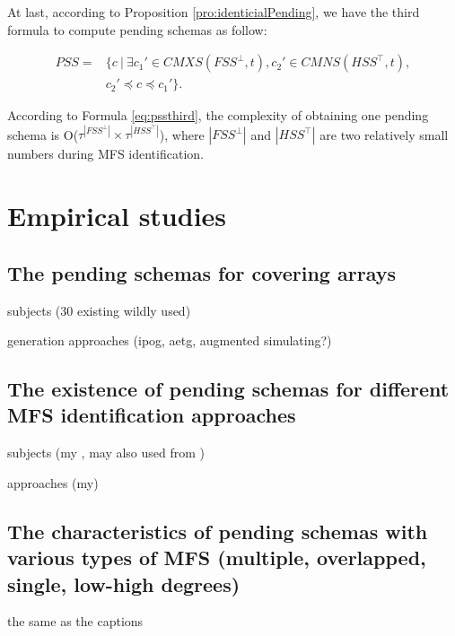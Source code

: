 {At last, according to Proposition \ref{pro:identicialPending}, we have the third formula to compute pending schemas as follow:

\begin{equation}\label{eq:pssthird}
\begin{aligned}
PSS = & \{ c\ |\ \exists c_{1}' \in CMXS(FSS^{\bot}, t), c_{2}' \in CMNS(HSS^{\top}, t), \\
    & c_{2}' \preceq c \preceq c_{1}' \}.
\end{aligned}
\end{equation}

According to Formula \ref{eq:pssthird}, the complexity of obtaining one pending schema is O($ \tau^{|FSS^{\bot}|} \times \tau^{|HSS^{\top}|}$), where $|FSS^{\bot}|$ and $|HSS^{\top}|$ are two relatively small numbers during MFS identification.




\section{Empirical studies}\label{emp}


\subsection{The pending schemas for covering arrays}

subjects (30 existing wildly used)

generation approaches (ipog, aetg, augmented simulating?)

\subsection{The existence of pending schemas for different MFS identification approaches}

subjects (my , may also used from )

approaches (my)

\subsection{The characteristics of pending schemas with various types of MFS (multiple, overlapped, single, low-high degrees)}

the same as the captions


}
